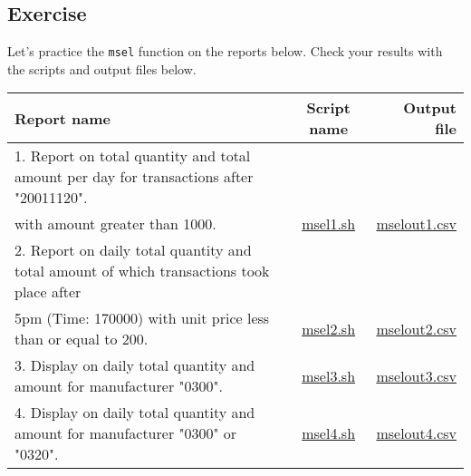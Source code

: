 
\subsection{Exercise }

Let's practice the \verb|msel| function on the reports below. Check your results with the scripts and output files below. 

\begin{table}[htbp]
{\small
\begin{tabular}{ l | c || r }
\hline
\textbf{Report name}   & \textbf{Script name} & \textbf{Output file}  \\
\hline
1. Report on total quantity and total amount per day for transactions after "20011120". \\ with amount greater than 1000. & \href{exercise/msel1.sh}{msel1.sh} & \href{exercise/outdat/mselout1.csv}{mselout1.csv} \\
2. Report on daily total quantity and total amount of which transactions took place after \\ 5pm
(Time: 170000) with unit price less than or equal to 200. & \href{exercise/msel2.sh}{msel2.sh} & \href{exercise/outdat/mselout2.csv}{mselout2.csv} \\
3. Display on daily total quantity and amount for manufacturer "0300". & \href{exercise/msel3.sh}{msel3.sh} & \href{exercise/outdat/mselout3.csv}{mselout3.csv} \\
4. Display on daily total quantity and amount for manufacturer "0300"  or  "0320". & \href{exercise/msel4.sh}{msel4.sh} & \href{exercise/outdat/mselout4.csv}{mselout4.csv} \\
\hline
\end{tabular} 
}
\end{table} 


%
